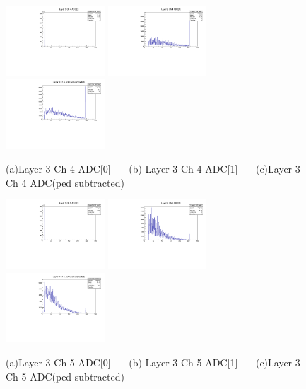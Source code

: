\documentclass[a4paper,11pt]{article}
\theoremstyle{mytheor}
\begin{document}
\begin{figure}[H] 
\vspace*{-0.3cm} 
\includegraphics[width=0.33\textwidth,scale=0.5,trim=0 0 0 0,clip]{plotsdir/file0_test-Layer3_Ch4_adc0-1.pdf} 
\includegraphics[width=0.33\textwidth,scale=0.5,trim=0 0 0 0,clip]{plotsdir/file0_test-Layer3_Ch4_adc1-1.pdf} 
\includegraphics[width=0.33\textwidth,scale=0.5,trim=0 0 0 0,clip]{plotsdir/file0_test-Layer3_Ch4_adcPedsub-1.pdf} 
\caption{(a)Layer 3 Ch 4 ADC[0] ~~~(b) Layer 3 Ch 4 ADC[1] ~~~(c)Layer 3 Ch 4 ADC(ped subtracted) } 
\end{figure} 
\begin{figure}[H] 
\vspace*{-0.3cm} 
\includegraphics[width=0.33\textwidth,scale=0.5,trim=0 0 0 0,clip]{plotsdir/file0_test-Layer3_Ch5_adc0-1.pdf} 
\includegraphics[width=0.33\textwidth,scale=0.5,trim=0 0 0 0,clip]{plotsdir/file0_test-Layer3_Ch5_adc1-1.pdf} 
\includegraphics[width=0.33\textwidth,scale=0.5,trim=0 0 0 0,clip]{plotsdir/file0_test-Layer3_Ch5_adcPedsub-1.pdf} 
\caption{(a)Layer 3 Ch 5 ADC[0] ~~~(b) Layer 3 Ch 5 ADC[1] ~~~(c)Layer 3 Ch 5 ADC(ped subtracted) } 
\end{figure} 
\end{document}

